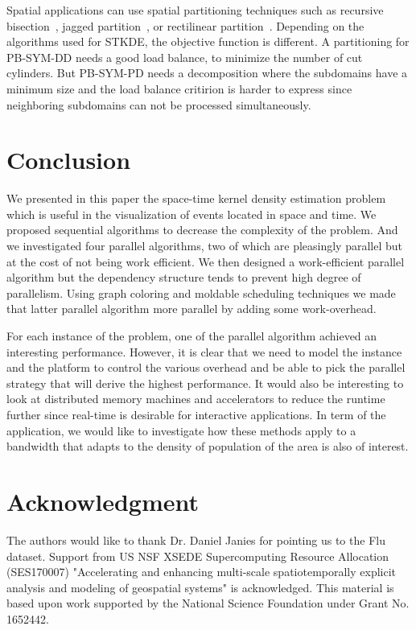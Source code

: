 \documentclass{article}
\begin{document}
Spatial applications can use spatial partitioning techniques 
such as recursive bisection~\cite{berger87}, jagged partition~\cite{ujaldon96,pinar97,DeveciRDC16}, or
rectilinear partition~\cite{nicol94,manne96}. Depending on the algorithms used for
STKDE, the objective function is different. A partitioning for
PB-SYM-DD needs a good load balance, to minimize the number of cut
cylinders. But PB-SYM-PD
needs a decomposition where the subdomains have a minimum size and the load balance critirion is harder to express since
neighboring subdomains can not be processed simultaneously.

\section{Conclusion}

We presented in this paper the space-time kernel density estimation
problem which is useful in the visualization of events located in
space and time. We proposed sequential algorithms to decrease the
complexity of the problem. And we investigated four parallel
algorithms, two of which are pleasingly parallel but at the cost of
not being work efficient. We then designed a work-efficient parallel
algorithm but the dependency structure tends to prevent high degree of
parallelism. Using graph coloring and moldable scheduling techniques
we made that latter parallel algorithm more parallel by adding some
work-overhead.

For each instance of the problem, one of the parallel algorithm
achieved an interesting performance. However, it is clear that we need
to model the instance and the platform to control the various overhead
and be able to pick the parallel strategy that will derive the highest
performance. It would also be interesting to look at distributed
memory machines and accelerators to reduce the runtime further since
real-time is desirable for interactive applications. In term of the
application, we would like to investigate how these methods apply to a
bandwidth that adapts to the density of population of the area is also
of interest.

\section*{Acknowledgment}

The authors would like to thank Dr. Daniel Janies for pointing us to
the Flu dataset.
%
Support from US NSF XSEDE Supercomputing Resource Allocation
(SES170007) "Accelerating and enhancing multi-scale spatiotemporally
explicit analysis and modeling of geospatial systems" is acknowledged.
%
This material is based upon work supported by the National Science Foundation under Grant No. 1652442.



\end{document}
